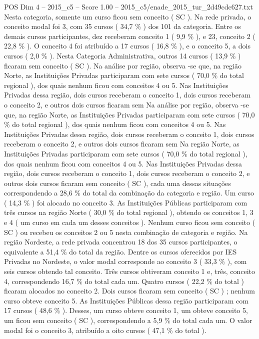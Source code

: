 \begin{textsample}{POS Dim 4 – 2015\_c5 – Score 1.00 – 2015\_c5/enade\_2015\_tur\_2d49cdc627.txt}
Nesta categoria, somente um curso ficou sem conceito ( SC ).
Na rede privada, o conceito modal foi 3, com 35 cursos ( 34,7 \% ) dos 101 da categoria.
Entre os demais cursos participantes, dez receberam conceito 1 ( 9,9 \% ), e 23, conceito 2 ( 22,8 \% ).
O conceito 4 foi atribuído a 17 cursos ( 16,8 \% ), e o conceito 5, a dois cursos ( 2,0 \% ).
Nesta Categoria Administrativa, outros 14 cursos ( 13,9 \% ) ficaram sem conceito ( SC ).
Na análise por região, observa -se que, na região Norte, as Instituições Privadas participaram com sete cursos ( 70,0 \% do total regional ), dos quais nenhum ficou com conceitos 4 ou 5.
Nas Instituições Privadas dessa região, dois cursos receberam o conceito 1, dois cursos receberam o conceito 2, e outros dois cursos ficaram sem Na análise por região, observa -se que, na região Norte, as Instituições Privadas participaram com sete cursos ( 70,0 \% do total regional ), dos quais nenhum ficou com conceitos 4 ou 5.
Nas Instituições Privadas dessa região, dois cursos receberam o conceito 1, dois cursos receberam o conceito 2, e outros dois cursos ficaram sem Na região Norte, as Instituições Privadas participaram com sete cursos ( 70,0 \% do total regional ), dos quais nenhum ficou com conceitos 4 ou 5.
Nas Instituições Privadas dessa região, dois cursos receberam o conceito 1, dois cursos receberam o conceito 2, e outros dois cursos ficaram sem conceito ( SC ), cada uma dessas situações correspondendo a 28,6 \% do total da combinação da categoria e região.
Um curso ( 14,3 \% ) foi alocado no conceito 3.
As Instituições Públicas participaram com três cursos na região Norte ( 30,0 \% do total regional ), obtendo os conceitos 1, 3 e 4 ( um curso em cada um desses conceitos ).
Nenhum curso ficou sem conceito ( SC ) ou recebeu os conceitos 2 ou 5 nesta combinação de categoria e região.
Na região Nordeste, a rede privada concentrou 18 dos 35 cursos participantes, o equivalente a 51,4 \% do total da região.
Dentre os cursos oferecidos por IES Privadas no Nordeste, o valor modal corresponde ao conceito 3 ( 33,3 \% ), com seis cursos obtendo tal conceito.
Três cursos obtiveram conceito 1 e, três, conceito 4, correspondendo 16,7 \% do total cada um.
Quatro cursos ( 22,2 \% do total ) ficaram alocados no conceito 2.
Dois cursos ficaram sem conceito ( SC ) ; nenhum curso obteve conceito 5.
As Instituições Públicas dessa região participaram com 17 cursos ( 48,6 \% ).
Desses, um curso obteve conceito 1, um obteve conceito 5, um ficou sem conceito ( SC ), correspondendo a 5,9 \% do total cada um.
O valor modal foi o conceito 3, atribuído a oito cursos ( 47,1 \% do total ).

\end{textsample}

